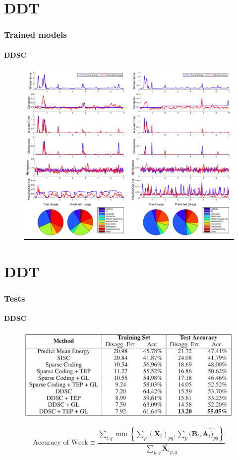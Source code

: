 \documentclass[gray]{beamer}
\begin{document}
\section{DDT}
\begin{frame}
\frametitle{Trained models}
\framesubtitle{DDSC}
\begin{figure}[H]
\centering
\includegraphics[scale=0.20]{./figures/trained.png}
\end{figure}
\end{frame}
\section{DDT}
\begin{frame}
\frametitle{Tests}
\framesubtitle{DDSC}
\begin{figure}[H]
\centering
\includegraphics[scale=0.25]{./figures/tests.png}
\end{figure}
\begin{equation*}
\text{Accuracy of Week} \equiv \frac{\sum_{i,q} \min \left\{ \sum_p ( \mathbf{X}_i)_{pq}, \sum_p ( \mathbf{B}_i,\hat{\mathbf{A}_i)_{pq}} \right\}}{\sum_{p,q} \bar{\mathbf{X}_i}_{p,q}}
\end{equation*}

\end{frame}
\end{document}

